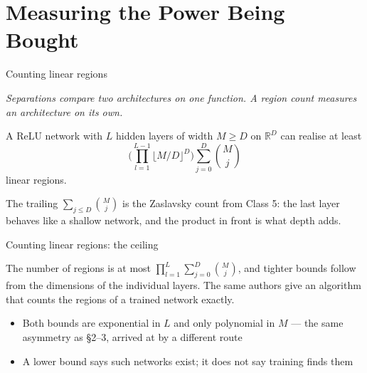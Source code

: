 \documentclass[aspectratio=169, 11pt]{beamer}
\newcommand{\bridge}[1]{%
  {\scriptsize\itshape\color{mcMuted} #1\par}\vspace{0.35em}}
\begin{document}
\section{Measuring the Power Being Bought}

\begin{frame}{Counting linear regions}
  \bridge{Separations compare two architectures on one function. A
  region count measures an architecture on its own.}
  \vspace{0.3em}
  \begin{theorem}
    {\small A ReLU network with $L$ hidden layers of width $M\geq D$ on
    $\mathbb{R}^{D}$ can realise at least
    \[
      \Big(\prod_{l=1}^{L-1}\big\lfloor M/D \big\rfloor^{D}\Big)
      \sum_{j=0}^{D}\binom{M}{j}
    \]
    linear regions.}
  \end{theorem}
  \vspace{0.3em}
  {\small The trailing $\sum_{j\leq D}\binom{M}{j}$ is the
  \alert{Zaslavsky count} from Class 5: the last layer behaves like a
  shallow network, and the product in front is what depth adds.}
\end{frame}

\begin{frame}{Counting linear regions: the ceiling}
  \vspace{0.3em}
  \begin{theorem}
    {\small The number of regions is at most
    $\prod_{l=1}^{L}\sum_{j=0}^{D}\binom{M}{j}$, and tighter bounds
    follow from the dimensions of the individual layers. The same
    authors give an algorithm that counts the regions of a trained
    network exactly.}
  \end{theorem}
  \vspace{0.5em}
  {\small
  \begin{itemize}\setlength{\itemsep}{4pt}
    \item Both bounds are \alert{exponential in $L$} and only
          \alert{polynomial in $M$} --- the same asymmetry as \S2--3,
          arrived at by a different route
    \item A lower bound says such networks \alert{exist}; it does not
          say training finds them
  \end{itemize}}
\end{frame}
\end{document}
